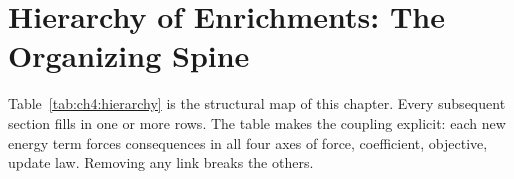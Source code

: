 \section{Hierarchy of Enrichments: The Organizing Spine}
\label{sec:ch4:hierarchy}

Table~\ref{tab:ch4:hierarchy} is the structural map of this chapter.
Every subsequent section fills in one or more rows.
The table makes the coupling explicit: each new energy term forces
consequences in all four axes of force, coefficient, objective, update law.
Removing any link breaks the others.

\begin{table}[htbp]
\centering
\caption{%
  \textbf{Four coupled enrichments from Stage~1 to Stage~2.}
  Each row is one link in the enrichment chain.
  Reading left to right: a new energy term (col~1) forces a new force
  channel (col~2), a new coefficient (col~3), a new objective term
  (col~4), and a new update law (col~5).
}
\label{tab:ch4:hierarchy}
\small
\setlength{\tabcolsep}{3.8pt}
\renewcommand{\arraystretch}{1.4}
\end{table}

